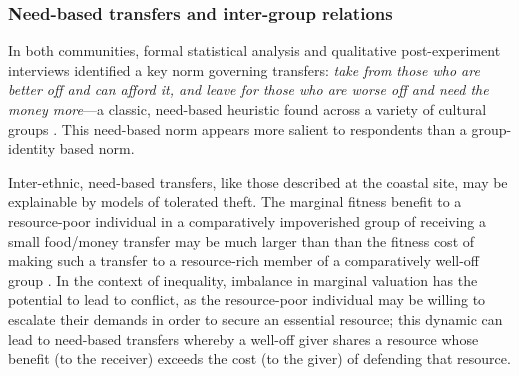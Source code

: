 \documentclass[bibauthoryear]{aa}
\begin{document}
\subsubsection{Need-based transfers and inter-group relations}\label{discneed}

In both communities, formal statistical analysis and qualitative post-experiment interviews identified a key norm governing transfers:
 \textit{take from those who are better off and can afford it, and leave for those who are worse off and need the money more}---a classic, need-based heuristic found across a variety of cultural groups
\citep[e.g., ][]{peterson1993demand, hooper2015inclusive, aktipis2016cooperation, hao2015need, gervais2017rich, cronk2019managing}. This need-based norm appears more salient to respondents than a group-identity based norm. %



Inter-ethnic, need-based transfers, like those described at the coastal site, may be explainable by models of tolerated theft. %
The marginal fitness benefit to a resource-poor individual in a comparatively impoverished group of receiving a small food/money transfer may be much larger than than the fitness cost of making such a transfer to a resource-rich member of a comparatively well-off group  \citep{jones1984selfish, winterhalder1996marginal, winterhalder1997gifts}. In the context of inequality, imbalance in marginal valuation has the potential to lead to conflict, as the resource-poor individual may be willing to escalate their demands in order to secure an essential resource; this dynamic can lead to need-based transfers whereby a well-off giver shares a resource whose benefit (to the receiver) exceeds the cost (to the giver) of defending that resource.
\end{document}
